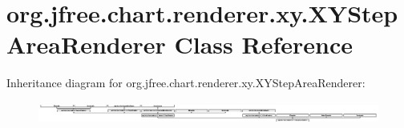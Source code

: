 \hypertarget{classorg_1_1jfree_1_1chart_1_1renderer_1_1xy_1_1_x_y_step_area_renderer}{}\section{org.\+jfree.\+chart.\+renderer.\+xy.\+X\+Y\+Step\+Area\+Renderer Class Reference}
\label{classorg_1_1jfree_1_1chart_1_1renderer_1_1xy_1_1_x_y_step_area_renderer}
Inheritance diagram for org.\+jfree.\+chart.\+renderer.\+xy.\+X\+Y\+Step\+Area\+Renderer\+:\begin{figure}[H]
\begin{center}
\leavevmode
\includegraphics[height=0.706625cm]{classorg_1_1jfree_1_1chart_1_1renderer_1_1xy_1_1_x_y_step_area_renderer}
\end{center}
\end{figure}
